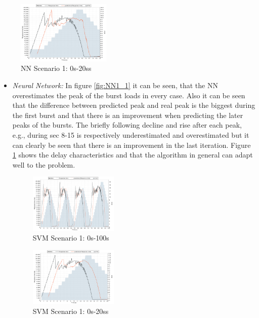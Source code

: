 \begin{figure}[ht]
	\begin{center}
		\includegraphics[width=0.40\textwidth]{chapters/chapter5/fig/NN1_2}
	\end{center}
	\caption{NN Scenario 1: 0s-20ss}
	\label{fig:NN1_2}
\end{figure}

\begin{itemize}
\item \textit{Neural Network:} In figure \ref*{fig:NN1_1} it can be seen, that the NN overestimates the peak of the burst loads in every case. Also it can be seen that the difference between predicted peak and real peak is the biggest during the first burst and that there is an improvement when predicting the later peaks of the bursts. The briefly following decline and rise after each peak, e.g., during sec 8-15 is respectively underestimated and overestimated but it can clearly be seen that there is an improvement in the last iteration. Figure \ref*{fig:NN1_2} shows the delay characteristics and that the algorithm in general can adapt well to the problem. 


\begin{figure}[ht]
	\begin{center}
		\includegraphics[width=0.40\textwidth]{chapters/chapter5/fig/SVM1_1}
	\end{center}
	\caption{SVM Scenario 1: 0s-100s}
	\label{fig:SVM1_1}
\end{figure}

\begin{figure}[ht]
	\begin{center}
		\includegraphics[width=0.40\textwidth]{chapters/chapter5/fig/SVM1_2}
	\end{center}
	\caption{SVM Scenario 1: 0s-20ss}
	\label{fig:SVM1_2}
\end{figure}


\end{itemize}
